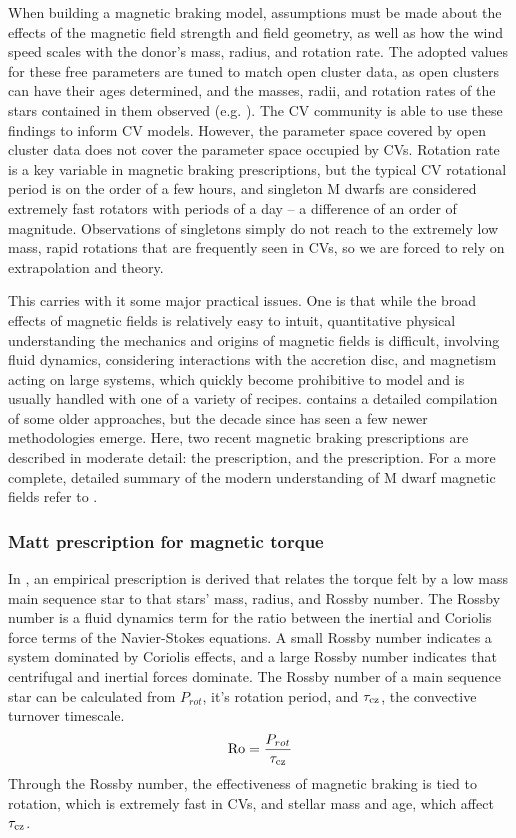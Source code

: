 When building a magnetic braking model, assumptions must be made about the effects of the magnetic field strength and field geometry, as well as how the wind speed scales with the donor's mass, radius, and rotation rate. The adopted values for these free parameters are tuned to match open cluster data, as open clusters can have their ages determined, and the masses, radii, and rotation rates of the stars contained in them observed (e.g. \citealt{matt2015,garraffo2018a}). The CV community is able to use these findings to inform CV models.
However, the parameter space covered by open cluster data does not cover the parameter space occupied by CVs. Rotation rate is a key variable in magnetic braking prescriptions, but the typical CV rotational period is on the order of a few hours, and singleton M dwarfs are considered extremely fast rotators with periods of a day -- a difference of an order of magnitude. Observations of singletons simply do not reach to the extremely low mass, rapid rotations that are frequently seen in CVs, so we are forced to rely on extrapolation and theory.

This carries with it some major practical issues. One is that while the broad effects of magnetic fields is relatively easy to intuit, quantitative physical understanding the mechanics and origins of magnetic fields is difficult, involving fluid dynamics, considering interactions with the accretion disc, and magnetism acting on large systems, which quickly become prohibitive to model and is usually handled with one of a variety of recipes. \citealt{knigge11} contains a detailed compilation of some older approaches, but the decade since has seen a few newer methodologies emerge. Here, two recent magnetic braking prescriptions are described in moderate detail: the \citet{matt2015} prescription, and the \citet{garraffo2018a} prescription. For a more complete, detailed summary of the modern understanding of M dwarf magnetic fields refer to \citet{kochukhov2021}. 


\subsubsection{Matt prescription for magnetic torque}
\label{sect:introduction:matt braking}

In \citet{matt2015}, an empirical prescription is derived that relates the torque felt by a low mass main sequence star to that stars' mass, radius, and Rossby number. The Rossby number is a fluid dynamics term for the ratio between the inertial and Coriolis force terms of the Navier-Stokes equations. A small Rossby number indicates a system dominated by Coriolis effects, and a large Rossby number indicates that centrifugal and inertial forces dominate. The Rossby number of a main sequence star can be calculated from $P_{rot}$, it's rotation period, and $\tau_{\rm cz}$, the convective turnover timescale.
\begin{equation}
    \label{eqn:introduction:rossby number}
    {\rm Ro} = \frac{P_{rot}}{\tau_{\rm cz}}
\end{equation}
Through the Rossby number, the effectiveness of magnetic braking is tied to rotation, which is extremely fast in CVs, and stellar mass and age, which affect $\tau_{\rm cz}$.

